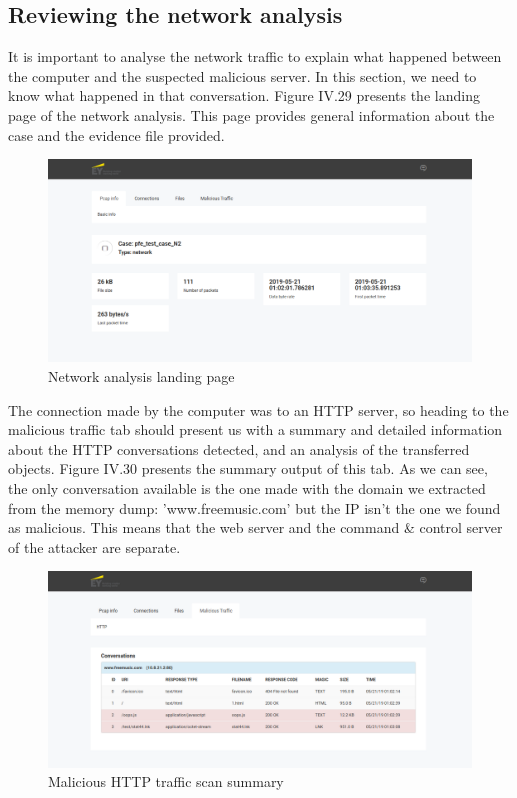 \subsection{Reviewing the network analysis}
It is important to analyse the network traffic to explain what happened between the computer and the suspected malicious server. In this section, we need to know what happened in that conversation.
Figure IV.29 presents the landing page of the network analysis. This page provides general information about the case and the evidence file provided.
\begin{figure}[H]
\centering
\includegraphics[width=0.9\columnwidth]{Figures/29.png}
\caption{Network analysis landing page}
\end{figure}
The connection made by the computer was to an HTTP server, so heading to the malicious traffic tab should present us with a summary and detailed information about the HTTP conversations detected, and an analysis of the transferred objects. Figure IV.30 presents the summary output of this tab. As we can see, the only conversation available is the one made with the domain we extracted from the memory dump: 'www.freemusic.com' but the IP isn't the one we found as malicious. This means that the web server and the command & control server of the attacker are separate.
\begin{figure}[H]
\centering
\includegraphics[width=0.9\columnwidth]{Figures/30.png}
\caption{Malicious HTTP traffic scan summary}
\end{figure}

